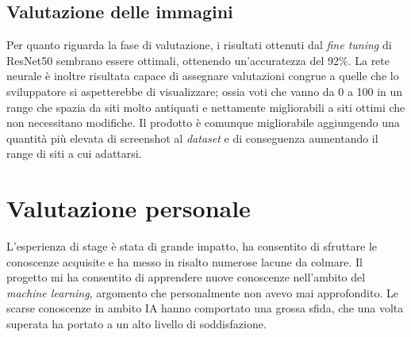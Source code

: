\subsection{Valutazione delle immagini}
Per quanto riguarda la fase di valutazione, i risultati ottenuti dal \emph{fine tuning} di ResNet50 sembrano essere ottimali, ottenendo un'accuratezza del 92\%.
La rete neurale è inoltre risultata capace di assegnare valutazioni congrue a quelle che lo sviluppatore si aspetterebbe di visualizzare; ossia voti che vanno da 0 a 100 in un range che spazia da siti molto antiquati e nettamente migliorabili a siti ottimi che non necessitano modifiche.
Il prodotto è comunque migliorabile aggiungendo una quantità più elevata di screenshot al \emph{dataset} e di conseguenza aumentando il range di siti a cui adattarsi.

\section{Valutazione personale}
L'esperienza di stage è stata di grande impatto, ha consentito di sfruttare le conoscenze acquisite e ha messo in risalto numerose lacune da colmare.
Il progetto mi ha consentito di apprendere nuove conoscenze nell'ambito del \emph{machine learning}, argomento che personalmente non avevo mai approfondito. 
Le scarse conoscenze in ambito IA hanno comportato una grossa sfida, che una volta superata ha portato a un alto livello di soddisfazione.

